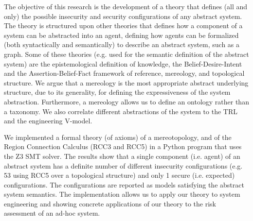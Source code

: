 The objective of this research is the development of a theory that defines (all
and only) the possible insecurity and security configurations of any abstract
system. The theory is structured upon other theories that defines how a
component of a system can be abstracted into an agent, defining how agents can
be formalized (both syntactically and semantically) to describe an abstract
system, such as a graph. Some of these theories (e.g. used for the semantic
definition of the abstract system) are the epistemological definition of
knowledge, the Belief-Desire-Intent and the Assertion-Belief-Fact framework of
reference, mereology, and topological structure. We argue that a mereology is
the most appropriate abstract underlying structure, due to its generality, for
defining the expressiveness of the system abstraction.  Furthermore, a
mereology allows us to define an ontology rather than a taxonomy.  We also
correlate different abstractions of the system to the TRL and the engineering
V-model. 

We implemented a formal theory (of axioms) of a mereotopology, and of the
Region Connection Calculus (RCC3 and RCC5) in a Python program that uses the Z3
SMT solver. The results show that a single component (i.e.  agent) of an
abstract system has a definite number of  different insecurity configurations
(e.g. 53 using RCC5 over a topological structure) and only 1 secure (i.e.
expected) configurations. The configurations are reported as models satisfying
the abstract system semantics. The implementation allows us to  apply our
theory to system engineering and showing concrete applications of our theory to
the risk assessment of an ad-hoc system.
